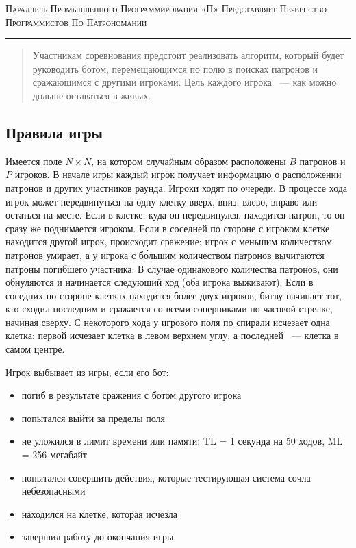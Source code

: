 \documentclass[a4paper,12pt]{article}
\begin{document}
\begin{center}
{\small\textsc{Параллель Промышленного Программирования «П» Представляет Первенство Программистов По Патрономании}}
\vskip 1pt \hrule \vskip 3pt

\end{center}
\begin{abstract}
Участникам соревнования предстоит реализовать алгоритм, который будет руководить ботом, перемещающимся по полю в поисках патронов и сражающимся с другими игроками. Цель каждого игрока ~--- как можно дольше оставаться в живых.
\end{abstract}
\subsection{Правила игры}
Имеется поле $N\times N$, на котором случайным образом расположены $B$ патронов и $P$ игроков. В начале игры каждый игрок получает информацию о расположении патронов и других участников раунда. Игроки ходят по очереди. В процессе хода игрок может передвинуться на одну клетку вверх, вниз, влево, вправо или остаться на месте. Если в клетке, куда он передвинулся, находится патрон, то он сразу же поднимается игроком. Если в соседней по стороне с игроком клетке находится другой игрок, происходит сражение: игрок с меньшим количеством патронов умирает, а у игрока с б\'{о}льшим количеством патронов вычитаются патроны погибшего участника. В случае одинакового количества патронов, они обнуляются и начинается следующий ход (оба игрока выживают). Если в соседних по стороне клетках находится более двух игроков, битву начинает тот, кто сходил последним и сражается со всеми соперниками по часовой стрелке, начиная сверху. С некоторого хода у игрового поля по спирали исчезает одна клетка: первой исчезает клетка в левом верхнем углу, а последней ~--- клетка в самом центре.
\begin{flushleft}
Игрок выбывает из игры, если его бот:
\begin{itemize}
\item погиб в результате сражения с ботом другого игрока
\item попытался выйти за пределы поля
\item не уложился в лимит времени или памяти:
TL = 1 секунда на 50 ходов, ML = 256 мегабайт
\item попытался совершить действия, которые тестирующая система сочла небезопасными
\item находился на клетке, которая исчезла
\item завершил работу до окончания игры
\end{itemize}
\end{flushleft}
\end{document}
